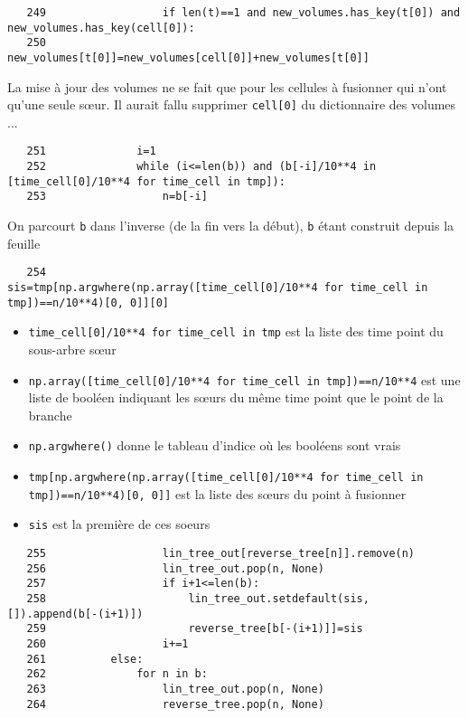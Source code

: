 \documentclass{article}
\def \mycolor {red}
\begin{document}
\color{black}
\begin{verbatim}
   249	                if len(t)==1 and new_volumes.has_key(t[0]) and new_volumes.has_key(cell[0]):
   250	                    new_volumes[t[0]]=new_volumes[cell[0]]+new_volumes[t[0]]
\end{verbatim} 
\color{\mycolor}
La mise \`a jour des volumes ne se fait que pour les cellules \`a fusionner qui n'ont qu'une seule s{\oe}ur. Il aurait fallu supprimer \verb|cell[0]| du dictionnaire des volumes ...
\color{black}
\begin{verbatim}
   251	            i=1
   252	            while (i<=len(b)) and (b[-i]/10**4 in [time_cell[0]/10**4 for time_cell in tmp]):
   253	                n=b[-i]
\end{verbatim} 
\color{\mycolor}
On parcourt \verb|b| dans l'inverse (de la fin vers la d\'ebut), \verb|b| \'etant construit depuis la feuille
\color{black}
\begin{verbatim}
   254	                sis=tmp[np.argwhere(np.array([time_cell[0]/10**4 for time_cell in tmp])==n/10**4)[0, 0]][0]
\end{verbatim} 
\color{\mycolor}
\begin{itemize}
\item \verb|time_cell[0]/10**4 for time_cell in tmp| est la liste des time point du sous-arbre s{\oe}ur
\item \verb|np.array([time_cell[0]/10**4 for time_cell in tmp])==n/10**4| est une liste de bool\'een indiquant les s{\oe}urs du m\^eme time point que le point de la branche
\item \verb|np.argwhere()| donne le tableau d'indice o\`u les bool\'eens sont vrais
\item \verb|tmp[np.argwhere(np.array([time_cell[0]/10**4 for time_cell in tmp])==n/10**4)[0, 0]]| est la liste des s{\oe}urs du point \`a fusionner
\item \verb|sis| est la premi\`ere de ces soeurs 
\end{itemize}
\color{black}
\begin{verbatim}
   255	                lin_tree_out[reverse_tree[n]].remove(n)
   256	                lin_tree_out.pop(n, None)
   257	                if i+1<=len(b):
   258	                    lin_tree_out.setdefault(sis, []).append(b[-(i+1)])
   259	                    reverse_tree[b[-(i+1)]]=sis
   260	                i+=1
   261	        else:
   262	            for n in b:
   263	                lin_tree_out.pop(n, None)
   264	                reverse_tree.pop(n, None)
\end{verbatim} 
\end{document}
